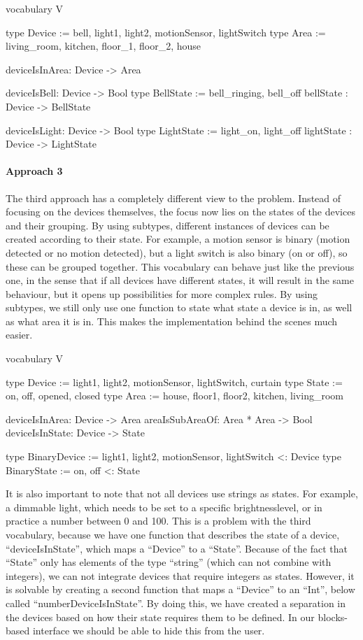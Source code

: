 \documentclass[11pt,a4paper]{report}
\begin{document}
\begin{idplisting}
vocabulary V {
   type Device := {bell, light1, light2, motionSensor, lightSwitch}
   type Area := {living_room, kitchen, floor_1, floor_2, house}

   deviceIsInArea: Device -> Area

   deviceIsBell: Device -> Bool
   type BellState := {bell_ringing, bell_off}
   bellState : Device -> BellState

   deviceIsLight: Device -> Bool
   type LightState := {light_on, light_off}
   lightState : Device -> LightState
}
\end{idplisting}

\paragraph{Approach 3}
The third approach has a completely different view to the problem. Instead of focusing on the devices themselves, the focus now lies on the states of the devices and their grouping. By using subtypes, different instances of devices can be created according to their state. For example, a motion sensor is binary (motion detected or no motion detected), but a light switch is also binary (on or off), so these can be grouped together. This vocabulary can behave just like the previous one, in the sense that if all devices have different states, it will result in the same behaviour, but it opens up possibilities for more complex rules. By using subtypes, we still only use one function to state what state a device is in, as well as what area it is in. This makes the implementation behind the scenes much easier.

\begin{idplisting}
vocabulary V {
    type Device := {light1, light2, motionSensor,
    lightSwitch, curtain}
    type State := {on, off, opened, closed}
    type Area := {house, floor1, floor2, kitchen, living_room}

    deviceIsInArea: Device -> Area
    areaIsSubAreaOf: Area * Area -> Bool
    deviceIsInState: Device -> State


    type BinaryDevice := {light1, light2,
                          motionSensor, lightSwitch} <: Device
    type BinaryState := {on, off} <: State
}
\end{idplisting}

It is also important to note that not all devices use strings as states. For example, a dimmable light, which needs to be set to a specific brightnesslevel, or in practice a number between 0 and 100. This is a problem with the third vocabulary, because we have one function that describes the state of a device, ``deviceIsInState'', which maps a ``Device'' to a ``State''. Because of the fact that ``State'' only has elements of the type ``string'' (which can not combine with integers), we can not integrate devices that require integers as states. However, it is solvable by creating a second function that maps a ``Device'' to an ``Int'', below called ``numberDeviceIsInState''. By doing this, we have created a separation in the devices based on how their state requires them to be defined. In our blocks-based interface we should be able to hide this from the user.
\end{document}

